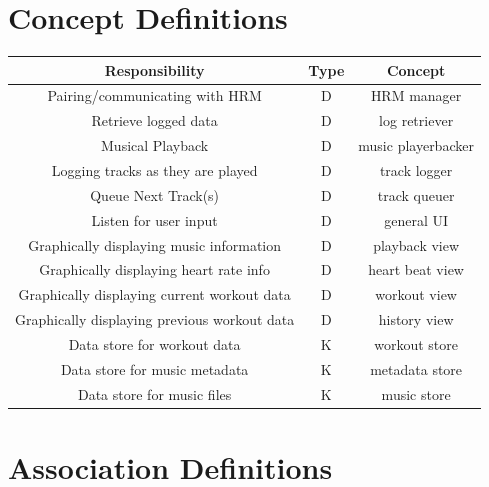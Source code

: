 \documentclass[letterpaper,english, 12pt]{scrreprt}
\begin{document}
    \section{Concept Definitions}
		\begin{center}
		\renewcommand{\arraystretch}{1.5}
	        \begin{tabular}[h]{|c|c|c|}
	           \hline
	           Responsibility & Type & Concept\\
	           \hline
	           Pairing/communicating with HRM & D & HRM manager\\
	           \hline
	           Retrieve logged data & D & log retriever\\
	           \hline
	           Musical Playback & D & music playerbacker\\
	           \hline
	           Logging tracks as they are played & D & track logger\\
	           \hline
	           Queue Next Track(s) & D & track queuer\\
	           \hline
	           Listen for user input & D & general UI\\
	           \hline
	           Graphically displaying music information & D & playback view\\
	           \hline
	           Graphically displaying heart rate info & D & heart beat view\\
	           \hline
	           Graphically displaying current workout data & D & workout view\\
	           \hline
	           Graphically displaying previous workout data & D & history view\\
	           \hline
	           Data store for workout data & K & workout store\\
	           \hline
	           Data store for music metadata & K & metadata store\\
	           \hline
	           Data store for music files & K & music store\\
	           \hline
	       \end{tabular}
		\end{center}
	   
    \section{Association Definitions}
		
\end{document}
